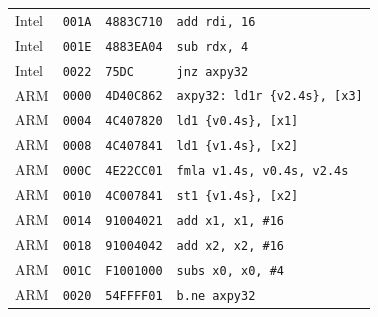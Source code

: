 \begin{table}[htbp]
\begin{tabular}{@{}l|l|l|p{7.2cm}@{}}
Intel & \texttt{001A} & \texttt{4883C710} & \texttt{add rdi, 16} \\
Intel & \texttt{001E} & \texttt{4883EA04} & \texttt{sub rdx, 4} \\
Intel & \texttt{0022} & \texttt{75DC} & \texttt{jnz axpy32} \\
\midrule
ARM & \texttt{0000} & \texttt{4D40C862} & \texttt{axpy32: ld1r \{v2.4s\}, [x3]} \\
ARM & \texttt{0004} & \texttt{4C407820} & \texttt{ld1 \{v0.4s\}, [x1]} \\
ARM & \texttt{0008} & \texttt{4C407841} & \texttt{ld1 \{v1.4s\}, [x2]} \\
ARM & \texttt{000C} & \texttt{4E22CC01} & \texttt{fmla v1.4s, v0.4s, v2.4s} \\
ARM & \texttt{0010} & \texttt{4C007841} & \texttt{st1 \{v1.4s\}, [x2]} \\
ARM & \texttt{0014} & \texttt{91004021} & \texttt{add x1, x1, \#16} \\
ARM & \texttt{0018} & \texttt{91004042} & \texttt{add x2, x2, \#16} \\
ARM & \texttt{001C} & \texttt{F1001000} & \texttt{subs x0, x0, \#4} \\
ARM & \texttt{0020} & \texttt{54FFFF01} & \texttt{b.ne axpy32} \\
\bottomrule
\end{tabular}
\endgroup
\end{table}
\noindent{}\par

